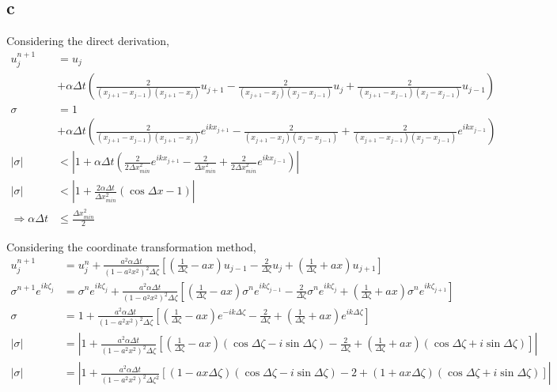 \documentclass[letterpaper,10pt]{article}
\begin{document}
\subsection{c}
Considering the direct derivation, 
\begin{align*}
  u_j^{n+1}&=u_j\\
  &+\alpha \Delta t\left(\frac{2}{(x_{j+1}-x_{j-1})(x_{j+1}-x_j)}u_{j+1}-\frac{2}{(x_{j+1}-x_{j})(x_j-x_{j-1})}u_j+\frac{2}{(x_{j+1}-x_{j-1})(x_j-x_{j-1})}u_{j-1}\right)\\
  \sigma&=1\\
  &+\alpha \Delta t\left(\frac{2}{(x_{j+1}-x_{j-1})(x_{j+1}-x_j)}e^{ikx_{j+1}}-\frac{2}{(x_{j+1}-x_{j})(x_j-x_{j-1})}+\frac{2}{(x_{j+1}-x_{j-1})(x_j-x_{j-1})}e^{ikx_{j-1}}\right)\\
  |\sigma|&<|1+\alpha \Delta t\left(\frac{2}{2\Delta x_{min}^2}e^{ikx_{j+1}}-\frac{2}{\Delta x_{min}^2}+\frac{2}{2\Delta x_{min}^2}e^{ikx_{j-1}}\right)|\\
  |\sigma|&<|1+\frac{2\alpha \Delta t}{\Delta x_{min}^2}\left(\cos \Delta x -1\right)|\\
  \Rightarrow \alpha \Delta t &\leq \frac{\Delta x_{min}^2}{2}
\end{align*}

Considering the coordinate transformation method, 
\begin{align*}
  u_j^{n+1}&=u_j^n+ \frac{a^2\alpha \Delta t}{(1-a^2x^2)^2\Delta \zeta}\left[\left(\frac{1}{\Delta \zeta}-ax\right)u_{j-1}-\frac{2}{\Delta \zeta}u_j+\left(\frac{1}{\Delta \zeta}+ax\right)u_{j+1}\right]\\
  \sigma^{n+1}e^{ik\zeta_j}&=\sigma^ne^{ik\zeta_j}+\frac{a^2\alpha \Delta t}{(1-a^2x^2)^2\Delta \zeta}\left[\left(\frac{1}{\Delta \zeta}-ax\right)\sigma^ne^{ik\zeta_{j-1}}-\frac{2}{\Delta \zeta}\sigma^ne^{ik\zeta_j}+\left(\frac{1}{\Delta \zeta}+ax\right)\sigma^ne^{ik\zeta_{j+1}}\right]\\
  \sigma&=1+\frac{a^2\alpha \Delta t}{(1-a^2x^2)^2\Delta \zeta}\left[\left(\frac{1}{\Delta \zeta}-ax\right)e^{-ik\Delta\zeta}-\frac{2}{\Delta \zeta}+\left(\frac{1}{\Delta \zeta}+ax\right)e^{ik\Delta\zeta}\right]\\
  |\sigma|&=|1+\frac{a^2\alpha \Delta t}{(1-a^2x^2)^2\Delta \zeta}\left[\left(\frac{1}{\Delta \zeta}-ax\right)\left(\cos\Delta\zeta-i\sin\Delta\zeta\right)-\frac{2}{\Delta \zeta}+\left(\frac{1}{\Delta \zeta}+ax\right)\left(\cos\Delta\zeta+i\sin\Delta\zeta\right)\right]|\\
  |\sigma|&=|1+\frac{a^2\alpha \Delta t}{(1-a^2x^2)^2\Delta \zeta^2}\left[\left(1-ax\Delta \zeta\right)\left(\cos\Delta\zeta-i\sin\Delta\zeta\right)-2+\left(1+ax\Delta \zeta\right)\left(\cos\Delta\zeta+i\sin\Delta\zeta\right)\right]|
\end{align*}
\end{document}
